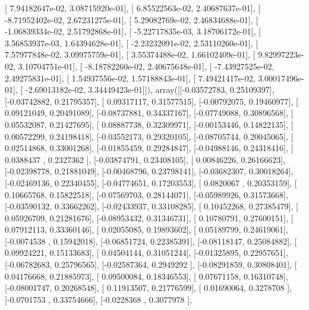 \documentclass{article}
\begin{document}
       [  7.94182647e-02,   3.08715920e-01],
       [  6.85522563e-02,   2.40687637e-01],
       [ -8.71952402e-02,   2.67231275e-01],
       [  5.29082769e-02,   2.46834688e-01],
       [ -1.06839334e-02,   2.51792868e-01],
       [ -5.22717835e-03,   3.18706172e-01],
       [  3.56853937e-03,   1.64394628e-01],
       [ -2.23232091e-02,   2.53110260e-01],
       [  7.57977848e-02,   3.09975759e-01],
       [  3.55374488e-02,   1.66102409e-01],
       [  9.82997223e-02,   3.10704751e-01],
       [ -8.18782260e-02,   2.40675648e-01],
       [ -7.43927525e-02,   2.49275831e-01],
       [  1.54937556e-02,   1.57188843e-01],
       [  7.49421417e-02,   3.00017496e-01],
       [ -2.69013182e-02,   3.34449423e-01]]), array([[-0.03572783,  0.25109397],
       [-0.03742882,  0.21795357],
       [ 0.09317117,  0.31577515],
       [-0.00792075,  0.19460977],
       [ 0.09121049,  0.20491089],
       [-0.08737881,  0.34337167],
       [-0.07749088,  0.30896568],
       [ 0.05532087,  0.21427695],
       [ 0.08887738,  0.32309971],
       [-0.00153446,  0.14822135],
       [ 0.00572299,  0.24198418],
       [-0.03552173,  0.29320105],
       [-0.08705744,  0.20045065],
       [ 0.02514868,  0.33001268],
       [-0.01855459,  0.29284847],
       [-0.04988146,  0.24318416],
       [ 0.0388437 ,  0.2327362 ],
       [-0.03874791,  0.23408105],
       [ 0.00846226,  0.26166623],
       [-0.02398778,  0.21881049],
       [-0.00468796,  0.23798141],
       [-0.03682307,  0.30018264],
       [-0.02469136,  0.22340455],
       [-0.04774651,  0.17203553],
       [ 0.0820067 ,  0.20353159],
       [ 0.10665768,  0.15822518],
       [-0.07569703,  0.28144071],
       [-0.05989926,  0.31573668],
       [-0.03590132,  0.33662262],
       [-0.02433937,  0.33108285],
       [ 0.10452268,  0.27385479],
       [ 0.05926709,  0.21281676],
       [-0.08953432,  0.31346731],
       [ 0.10780791,  0.27600151],
       [ 0.07912113,  0.33360146],
       [ 0.02055085,  0.19893602],
       [ 0.05189799,  0.24619061],
       [-0.0074538 ,  0.15942018],
       [-0.06851724,  0.22385391],
       [-0.08118147,  0.25084882],
       [ 0.09924221,  0.15133683],
       [ 0.04504144,  0.31051244],
       [-0.01325895,  0.22957651],
       [-0.06782683,  0.25796565],
       [-0.02587364,  0.2949292 ],
       [-0.08291859,  0.30808401],
       [ 0.04176668,  0.21885973],
       [ 0.09500084,  0.18346553],
       [ 0.07671158,  0.16310748],
       [-0.08001747,  0.20268548],
       [ 0.11913507,  0.21776599],
       [ 0.01690064,  0.3278708 ],
       [-0.0701753 ,  0.33754666],
       [-0.0228368 ,  0.3077978 ],
\end{document}
